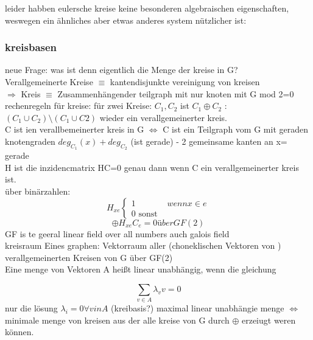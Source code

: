 \documentclass[a4paper]{article}
\theoremstyle{definition}
\theoremstyle{remark}
\begin{document}
leider habben eulersche kreise keine besonderen algebraischen eigenschaften, weswegen ein ähnliches aber etwas anderes system nützlicher ist:
\subsubsection{kreisbasen}
\label{ssub:kreisbasen}

neue Frage: was ist denn eigentlich die Menge der kreise in G?\\
Verallgemeinerte Kreise $ \equiv$  kantendisjunkte vereinigung von kreisen\\
$\Rightarrow$ Kreis  $ \equiv $ Zusammenhängender teilgraph mit nur knoten mit G mod 2=0\\
rechenregeln für kreise:
für zwei Kreise: $C_1,C_2$ ist $C_1\oplus C_2$  : $(C_1\cup C_2)\setminus (C_1\cup C2)$ wieder ein verallgemeinerter kreis.\\
C ist ien verallbemeinerter kreis in G $\Leftrightarrow$ C ist ein Teilgraph vom G mit geraden knotengraden $deg_{C_1}(x)+deg_{C_2}$ (ist gerade) - 2 gemeinsame kanten an x= gerade\\
H ist die inzidencmatrix
HC=0 genau dann wenn C ein verallgemeinerter kreis ist.\\
über binärzahlen: 
\begin{equation*}
  H_{xe}
  \begin{cases}
    1 & wenn x \in e\\
    0 \textrm{ sonst }
  \end{cases}
\end{equation*}
\begin{equation*}
  \oplus H_{xe}C_e =0 über GF(2)
\end{equation*}
GF is te geeral linear field over all numbers  auch galois field\\
kreisraum Eines graphen: Vektorraum aller (choneklischen Vektoren von ) verallgemeinerten Kreisen von G über GF(2)\\
Eine menge von Vektoren A heißt linear unabhängig, wenn die gleichung 

\begin{equation*}
  \sum_{v\in A} \lambda _v v=0
\end{equation*}
nur die lösung $\lambda _i=0 \forall v in A$ 
(kreibasis?)
 maximal linear unabhängie menge  $\Leftrightarrow$ minimale menge von kreisen aus der alle kreise von G durch $\oplus$ erzeiugt weren können.\\
\end{document}
